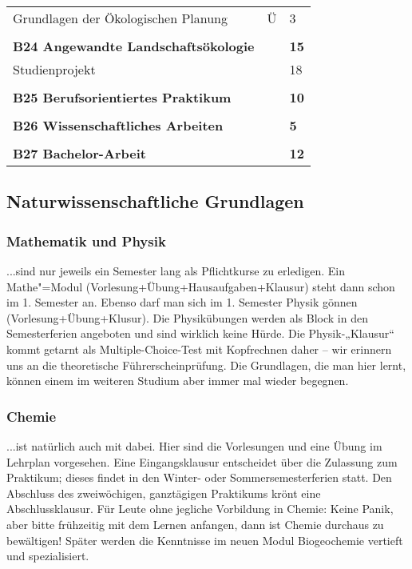 \begin{longtable}{p{} p{} p{}}
Grundlagen der Ökologischen Planung & Ü & 3\\
&&\\
\textbf{B24 Angewandte Landschaftsökologie} && \textbf{15}\\
Studienprojekt & & 18\\
&&\\
\textbf{B25 Berufsorientiertes Praktikum} & & \textbf{10}\\
&&\\
\textbf{B26 Wissenschaftliches Arbeiten} & & \textbf{5}\\
&&\\
\textbf{B27 Bachelor-Arbeit} && \textbf{12}\\
\end{longtable}

\subsection*{Naturwissenschaftliche Grundlagen}
\subsubsection*{Mathematik und Physik}
...sind nur jeweils ein Semester lang als Pﬂichtkurse zu erledigen. Ein Mathe"=Modul (Vorlesung+Übung+Hausaufgaben+Klausur) steht dann schon im 1. Semester an. Ebenso darf man sich im 1. Semester Physik gönnen (Vorlesung+Übung+Klusur). Die Physikübungen werden als Block in den Semesterferien angeboten und sind wirklich keine Hürde. Die Physik-„Klausur“ kommt getarnt als Multiple-Choice-Test mit Kopfrechnen daher – wir erinnern uns an die theoretische Führerscheinprüfung. Die Grundlagen, die man hier lernt, können einem im weiteren Studium aber immer mal wieder begegnen.

\subsubsection*{Chemie}
...ist natürlich auch mit dabei. Hier sind die Vorlesungen und eine Übung im Lehrplan vorgesehen. Eine Eingangsklausur entscheidet über die Zulassung zum Praktikum; dieses ﬁndet in den Winter- oder Sommersemesterferien statt. Den Abschluss des zweiwöchigen, ganztägigen Praktikums krönt eine Abschlussklausur. Für Leute ohne jegliche Vorbildung in Chemie: Keine Panik, aber bitte frühzeitig mit dem Lernen anfangen, dann ist Chemie durchaus zu bewältigen! Später werden die Kenntnisse im neuen Modul Biogeochemie vertieft und spezialisiert.

